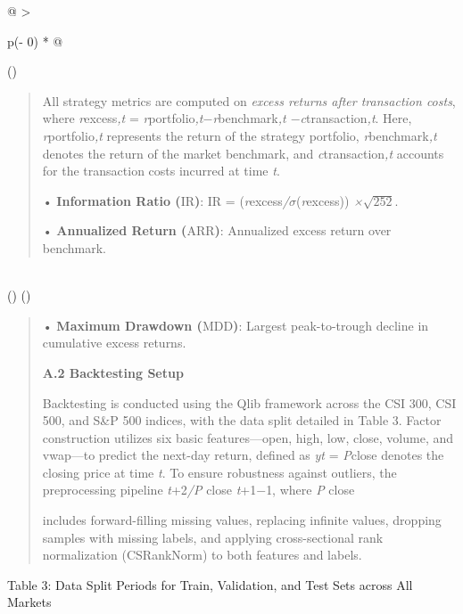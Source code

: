 \documentclass[
]{article}
\begin{document}
\begin{longtable}[]{@{}
  >{\raggedright\arraybackslash}p{(\columnwidth - 0\tabcolsep) * }@{}}
\toprule()
\begin{minipage}[b]{\linewidth}\raggedright
\begin{quote}
All strategy metrics are computed on \emph{excess returns after
transaction costs}, where \emph{r}excess\emph{,t} =
\emph{r}portfolio\emph{,t$-$r}benchmark\emph{,t $-$c}transaction\emph{,t}.
Here, \emph{r}portfolio\emph{,t} represents the return of the strategy
portfolio, \emph{r}benchmark\emph{,t} denotes the return of the market
benchmark, and \emph{c}transaction\emph{,t} accounts for the transaction
costs incurred at time \emph{t}.

• \textbf{Information Ratio (}IR\textbf{)}: IR =
(\emph{r}excess\emph{/$\sigma$}(\emph{r}excess)) \emph{×}$\sqrt{252}$.

• \textbf{Annualized Return (}ARR\textbf{)}: Annualized excess return
over benchmark.
\end{quote}
\end{minipage} \\
\midrule()
\endhead
\bottomrule()
\end{longtable}

\begin{quote}
• \textbf{Maximum Drawdown (}MDD\textbf{)}: Largest peak-to-trough
decline in cumulative excess returns.

\textbf{A.2 Backtesting Setup}

Backtesting is conducted using the Qlib framework across the CSI 300,
CSI 500, and S\&P 500 indices, with the data split detailed in Table 3.
Factor construction utilizes six basic features---open, high, low,
close, volume, and vwap---to predict the next-day return, defined as
\emph{yt} = \emph{P}close denotes the closing price at time \emph{t}. To
ensure robustness against outliers, the preprocessing pipeline
\emph{t}+2\emph{/P} close \emph{t}+1\emph{$-$}1, where \emph{P} close

includes forward-filling missing values, replacing infinite values,
dropping samples with missing labels, and applying cross-sectional rank
normalization (CSRankNorm) to both features and labels.
\end{quote}

Table 3: Data Split Periods for Train, Validation, and Test Sets across
All Markets
\end{document}
